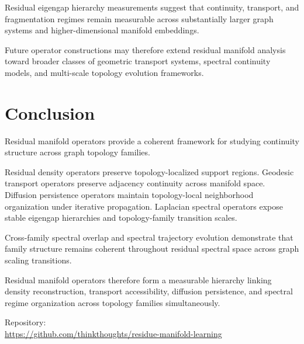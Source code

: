 \documentclass[11pt]{article}
\begin{document}
Residual eigengap hierarchy measurements suggest that continuity, transport, and fragmentation regimes remain measurable across substantially larger graph systems and higher-dimensional manifold embeddings.

Future operator constructions may therefore extend residual manifold analysis toward broader classes of geometric transport systems, spectral continuity models, and multi-scale topology evolution frameworks.

\section{Conclusion}

Residual manifold operators provide a coherent framework for studying continuity structure across graph topology families.

Residual density operators preserve topology-localized support regions. Geodesic transport operators preserve adjacency continuity across manifold space. Diffusion persistence operators maintain topology-local neighborhood organization under iterative propagation. Laplacian spectral operators expose stable eigengap hierarchies and topology-family transition scales.

Cross-family spectral overlap and spectral trajectory evolution demonstrate that family structure remains coherent throughout residual spectral space across graph scaling transitions.

Residual manifold operators therefore form a measurable hierarchy linking density reconstruction, transport accessibility, diffusion persistence, and spectral regime organization across topology families simultaneously.

\vspace{1em}

Repository:\\
\url{https://github.com/thinkthoughts/residue-manifold-learning}



\end{document}
